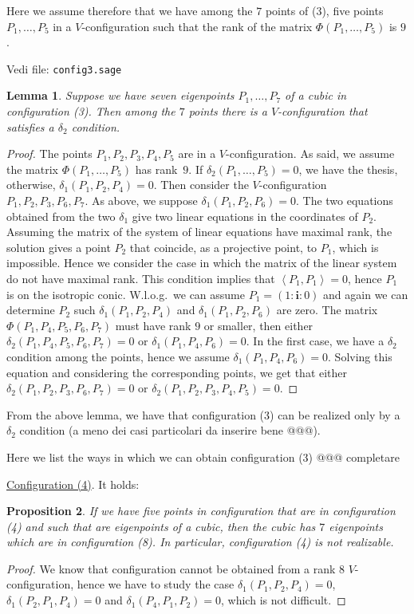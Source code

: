 \documentclass{amsart}
\theoremstyle{plain}
\newtheorem{lemma}{Lemma}[section]
\newtheorem{prop}[lemma]{Proposition}
\theoremstyle{definition}
\newcommand{\scl}[2]{\left\langle {#1}, {#2} \right\rangle}
\newcommand{\iii}{\textbf{i}}
\begin{document}
Here we assume therefore that we have among the $7$ points of (3),
five points $P_1, \dots, P_5$ in a $V$-configuration such that the
rank of the matrix $\Phi(P_1, \dots, P_5)$ is $9$.

Vedi file: \verb+config3.sage+
\begin{lemma}
\label{no_delta1_delta1} Suppose we have  seven eigenpoints $P_1, \dots, P_7$
of a cubic in configuration (3). Then among the $7$ points there is a
$V$-configuration that satisfies a $\delta_2$ condition.
\end{lemma}
\begin{proof}
The points $P_1, P_2, P_3, P_4, P_5$ are in a $V$-configuration. As said,
we assume the matrix $\Phi(P_1, \dots, P_5)$ has
rank~$9$. If
$\delta_2(P_1, \dots, P_5) = 0$, we have the thesis, otherwise,
$\delta_1(P_1, P_2, P_4) = 0$. Then consider the $V$-configuration
$P_1, P_2, P_3, P_6, P_7$. As above, we suppose $\delta_1(P_1, P_2, P_6) = 0$.
The two equations obtained from the two $\delta_1$ give two
linear equations in the coordinates
of $P_2$. Assuming the matrix of the system of linear equations have
maximal rank, the solution gives a point $P_2$ that coincide, as
a projective point, to $P_1$, which is impossible. Hence we consider the
case in which the matrix of the linear system do not have maximal rank.
This condition implies that $\scl{P_1}{P_1} = 0$, hence $P_1$ is on the
isotropic conic. W.l.o.g.\ we can assume $P_1 = (1: \iii: 0)$ and again
we can determine $P_2$ such $\delta_1(P_1, P_2, P_4)$ and
$\delta_1(P_1, P_2, P_6)$ are zero. The matrix $\Phi(P_1, P_4, P_5, P_6, P_7)$
must have rank $9$ or smaller, then either
$\delta_2(P_1, P_4, P_5, P_6, P_7)=0$ or $\delta_1(P_1, P_4, P_6) = 0$. In
the first case, we have a $\delta_2$ condition among the points, hence
we assume $\delta_1(P_1, P_4, P_6) = 0$. Solving this equation and
considering the corresponding points, we get that either
$\delta_2(P_1, P_2, P_3, P_6, P_7) = 0$ or
$\delta_2(P_1, P_2, P_3, P_4, P_5) = 0$.
\end{proof}

From the above lemma, we have that configuration (3) can be
realized only by a $\delta_2$ condition (a meno dei casi particolari
da inserire bene @@@).

Here we list the ways in which we can obtain configuration (3)
@@@ completare

\underline{Configuration (4)}. It holds:
\begin{prop}
\label{conf4no} If we have five points in configuration that are in
configuration (4) and such that are eigenpoints of a cubic, then the
cubic has $7$ eigenpoints which are in configuration (8). In particular,
configuration (4) is not realizable.
\end{prop}
\begin{proof}
We know that configuration cannot be obtained from a rank 8 $V$-configuration,
hence we have to study the case $\delta_1(P_1, P_2, P_4) = 0$,
$\delta_1(P_2, P_1, P_4) = 0$ and $\delta_1(P_4, P_1, P_2) = 0$,
which is not difficult.
\end{proof}
\end{document}
